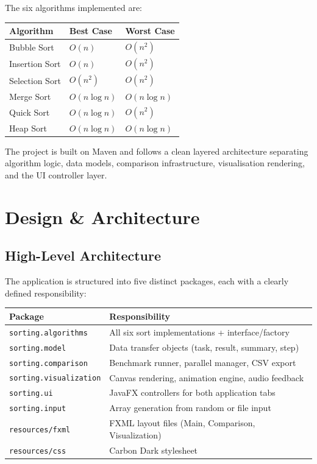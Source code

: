 \documentclass[12pt,a4paper]{article}
\begin{document}
The six algorithms implemented are:

\begin{center}
\begin{tabular}{lll}
\toprule
\textbf{Algorithm} & \textbf{Best Case} & \textbf{Worst Case} \\
\midrule
Bubble Sort    & $O(n)$        & $O(n^2)$       \\
Insertion Sort & $O(n)$        & $O(n^2)$       \\
Selection Sort & $O(n^2)$      & $O(n^2)$       \\
Merge Sort     & $O(n \log n)$ & $O(n \log n)$  \\
Quick Sort     & $O(n \log n)$ & $O(n^2)$       \\
Heap Sort      & $O(n \log n)$ & $O(n \log n)$  \\
\bottomrule
\end{tabular}
\end{center}

The project is built on Maven and follows a clean layered architecture separating
algorithm logic, data models, comparison infrastructure, visualisation rendering,
and the UI controller layer.

\section{Design \& Architecture}

\subsection{High-Level Architecture}

The application is structured into five distinct packages, each with a clearly
defined responsibility:

\begin{center}
\begin{tabular}{ll}
\toprule
\textbf{Package} & \textbf{Responsibility} \\
\midrule
\texttt{sorting.algorithms}  & All six sort implementations + interface/factory \\
\texttt{sorting.model}       & Data transfer objects (task, result, summary, step) \\
\texttt{sorting.comparison}  & Benchmark runner, parallel manager, CSV export \\
\texttt{sorting.visualization} & Canvas rendering, animation engine, audio feedback \\
\texttt{sorting.ui}          & JavaFX controllers for both application tabs \\
\texttt{sorting.input}       & Array generation from random or file input \\
\midrule
\texttt{resources/fxml}      & FXML layout files (Main, Comparison, Visualization) \\
\texttt{resources/css}       & Carbon Dark stylesheet \\
\bottomrule
\end{tabular}
\end{center}
\end{document}
